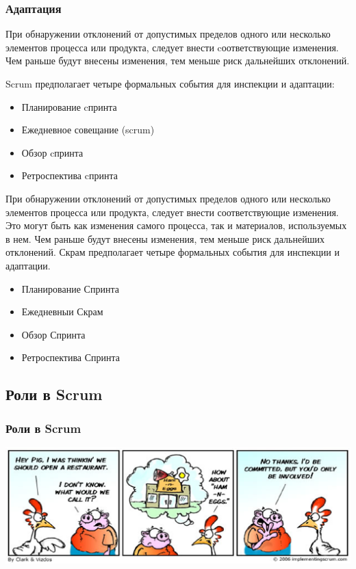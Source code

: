 \documentclass{../industrial-development}
\begin{document}
\begin{frame} \frametitle{Адаптация}
\begin{block}{}
При обнаружении \alert{отклонений} от допустимых пределов одного или несколько элементов процесса или продукта, следует внести  cоответствующие изменения. Чем \alert{раньше} будут внесены изменения, тем \alert{меньше} риск дальнейших отклонений.
\end{block}
Scrum предполагает четыре формальных события для \alert{инспекции} и \alert{адаптации:}
\begin{itemize}
\item Планирование cпринта
\item Ежедневное совещание (scrum)
\item Обзор cпринта
\item Ретроспектива cпринта
\end {itemize}
\end{frame}
\lecturenotes
\begin{block}{}
При обнаружении отклонений от допустимых пределов одного или несколько элементов
процесса или продукта, следует внести соответствующие изменения. Это могут быть как
изменения самого процесса, так и материалов, используемых в нем. Чем раньше будут
внесены изменения, тем меньше риск дальнейших отклонений.
Скрам предполагает четыре формальных события для инспекции и адаптации.
\begin{itemize}
\item Планирование Спринта
\item Ежедневныи Скрам
\item Обзор Спринта
\item Ретроспектива Спринта
\end {itemize}
\end {block}

\subsection{Роли в Scrum}

\begin{frame} \frametitle{Роли в Scrum}
	\centerline{\includegraphics[width=1.20\textheight]{sc2.png}}
\end{frame}
\end{document}
